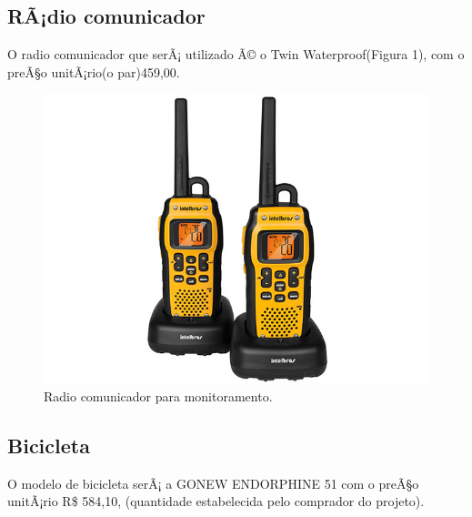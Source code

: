 \subsection{RÃ¡dio comunicador}

O radio comunicador  que serÃ¡ utilizado Ã© o Twin Waterproof(Figura 1), com o preÃ§o unitÃ¡rio(o par)459,00.

\begin{figure}[H]
	\centering
	\label{Radio comunicador para monitoramento.}
		\includegraphics[keepaspectratio=true,scale=0.5]{monitoramento/radio.jpg}
	\caption{Radio comunicador para monitoramento.}
\end{figure}

\subsection{Bicicleta}

O modelo de bicicleta serÃ¡ a GONEW ENDORPHINE 51 com o preÃ§o unitÃ¡rio R\$ 584,10, (quantidade estabelecida pelo comprador do projeto). 

